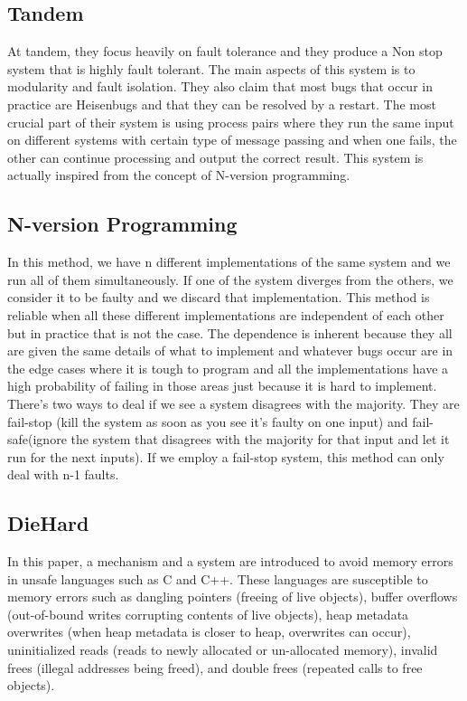 \documentclass[twoside]{article}
\begin{document}
\subsection{Tandem} At tandem, they focus heavily on fault tolerance and they produce a Non stop system that is highly fault tolerant. The main aspects of this system is to modularity and fault isolation. They also claim that most bugs that occur in practice are Heisenbugs and that they can be resolved by a restart. The most crucial part of their system is using process pairs where they run the same input on different systems with certain type of message passing and when one fails, the other can continue processing and output the correct result. This system is actually inspired from the concept of N-version programming.
\subsection{N-version Programming}
In this method, we have n different implementations of the same system and we run all of them simultaneously. If one of the system diverges from the others, we consider it to be faulty and we discard that implementation. This method is reliable when all these different implementations are independent of each other but in practice that is not the case. The dependence is inherent because they all are given the same details of what to implement and whatever bugs occur are in the edge cases where it is tough to program and all the implementations have a high probability of failing in those areas just because it is hard to implement. There's two ways to deal if we see a system disagrees with the majority. They are fail-stop (kill the system as soon as you see it's faulty on one input) and fail-safe(ignore the system that disagrees with the majority for that input and let it run for the next inputs). If we employ a fail-stop system, this method can only deal with n-1 faults.

\subsection{DieHard}

In this paper, a mechanism and a system are introduced to avoid memory errors in unsafe languages such as C and C++. These languages are susceptible to memory errors such as dangling pointers (freeing of live objects), buffer overflows (out-of-bound writes corrupting contents of live objects), heap metadata overwrites (when heap metadata is closer to heap, overwrites can occur), uninitialized reads (reads to newly allocated or un-allocated memory), invalid frees (illegal addresses being freed), and double frees (repeated calls to free objects).
\end{document}
